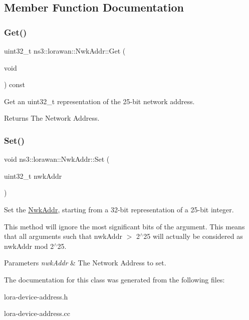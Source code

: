 \subsection{Member Function Documentation}
\mbox{\label{classns3_1_1lorawan_1_1NwkAddr_add27888617e928ccf58342bc15aa9d15}} 
\subsubsection{\texorpdfstring{Get()}{Get()}}
{\footnotesize\ttfamily uint32\+\_\+t ns3\+::lorawan\+::\+Nwk\+Addr\+::\+Get (\begin{DoxyParamCaption}\item[{void}]{ }\end{DoxyParamCaption}) const}

Get an uint32\+\_\+t representation of the 25-\/bit network address.

\begin{DoxyReturn}{Returns}
The Network Address. 
\end{DoxyReturn}
\mbox{\label{classns3_1_1lorawan_1_1NwkAddr_a1ab0b879c6c8124e21c700e2be3b83b4}} 
\subsubsection{\texorpdfstring{Set()}{Set()}}
{\footnotesize\ttfamily void ns3\+::lorawan\+::\+Nwk\+Addr\+::\+Set (\begin{DoxyParamCaption}\item[{uint32\+\_\+t}]{nwk\+Addr }\end{DoxyParamCaption})}

Set the \hyperlink{classns3_1_1lorawan_1_1NwkAddr}{Nwk\+Addr}, starting from a 32-\/bit representation of a 25-\/bit integer.

This method will ignore the most significant bits of the argument. This means that all arguments such that nwk\+Addr $>$ 2$^\wedge$25 will actually be considered as nwk\+Addr mod 2$^\wedge$25.


\begin{DoxyParams}{Parameters}
{\em nwk\+Addr} & The Network Address to set. \\
\hline
\end{DoxyParams}


The documentation for this class was generated from the following files\+:\begin{DoxyCompactItemize}
\item 
lora-\/device-\/address.\+h\item 
lora-\/device-\/address.\+cc\end{DoxyCompactItemize}
